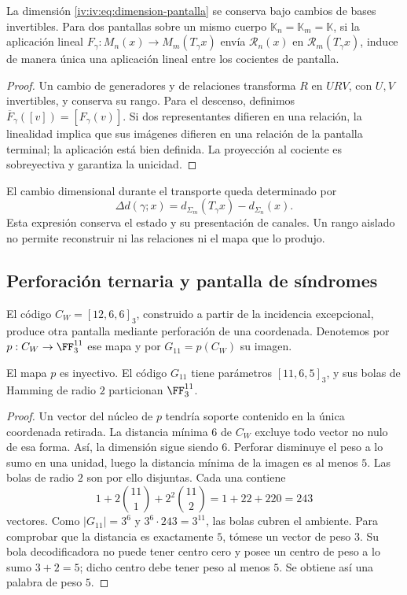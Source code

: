 \begin{proposition}
\label{iv:iv:prop:pantalla-transporte}
La dimensión \eqref{iv:iv:eq:dimension-pantalla} se conserva
bajo cambios de bases invertibles. Para dos pantallas sobre un mismo cuerpo
\(\mathbb K_n=\mathbb K_m=\mathbb K\), si la aplicación lineal
\(F_\gamma:M_n(x)\to M_m(T_\gamma x)\) envía
\(\mathcal R_n(x)\) en \(\mathcal R_m(T_\gamma x)\), induce
de manera única una aplicación lineal entre los cocientes de pantalla.
\end{proposition}
\begin{proof}
Un cambio de generadores y de relaciones transforma \(R\) en
\(URV\), con \(U,V\) invertibles, y conserva su rango. Para
el descenso, definimos
\(\overline F_\gamma([v])=[F_\gamma(v)]\). Si dos
representantes difieren en una relación, la linealidad implica que sus imágenes difieren
en una relación de la pantalla terminal; la aplicación está
bien definida. La proyección al cociente es sobreyectiva y
garantiza la unicidad.
\end{proof}

El cambio dimensional durante el transporte queda determinado
por
\[
 \Delta d(\gamma;x)=d_{\Sigma_m}(T_\gamma x)
                         -d_{\Sigma_n}(x).
\]
Esta expresión conserva el estado y su presentación de canales.
Un rango aislado no permite reconstruir ni las relaciones ni
el mapa que lo produjo.

\subsection{Perforación ternaria y pantalla de síndromes}

El código \(C_W=[12,6,6]_3\), construido a partir de la
incidencia excepcional, produce otra pantalla mediante
perforación de una coordenada. Denotemos por
\(p:C_W\to\FF_3^{11}\) ese mapa y por
\(G_{11}=p(C_W)\) su imagen.

\begin{proposition}
\label{iv:iv:prop:codigo-once}
El mapa \(p\) es inyectivo. El código \(G_{11}\) tiene
parámetros \([11,6,5]_3\), y sus bolas de Hamming de radio
\(2\) particionan \(\FF_3^{11}\).
\end{proposition}
\begin{proof}
Un vector del núcleo de \(p\) tendría soporte contenido en
la única coordenada retirada. La distancia mínima \(6\)
de \(C_W\) excluye todo vector no nulo de esa forma.
Así, la dimensión sigue siendo \(6\). Perforar disminuye
el peso a lo sumo en una unidad, luego la distancia mínima
de la imagen es al menos \(5\). Las bolas de radio \(2\)
son por ello disjuntas. Cada una contiene
\[
 1+2\binom{11}{1}+2^2\binom{11}{2}
 =1+22+220=243
\]
vectores. Como \(|G_{11}|=3^6\) y
\(3^6\cdot243=3^{11}\), las bolas cubren el ambiente.
Para comprobar que la distancia es exactamente \(5\),
tómese un vector de peso \(3\). Su bola decodificadora
no puede tener centro cero y posee un centro de peso a lo
sumo \(3+2=5\); dicho centro debe tener peso al menos
\(5\). Se obtiene así una palabra de peso \(5\).
\end{proof}

